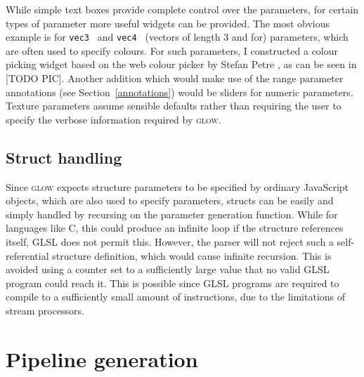 \documentclass[12pt,twoside,notitlepage]{report}
\begin{document}
While simple text boxes provide complete control over the parameters, for certain types of parameter more useful widgets can be provided. The most obvious example is for {\tt vec3 } and {\tt vec4 } (vectors of length 3 and for) parameters, which are often used to specify colours. For such parameters, I constructed a colour picking widget based on the web colour picker by Stefan Petre \cite{color}, as can be seen in [TODO PIC]. Another addition which would make use of the range parameter annotations (see Section~\ref{annotations}) would be sliders for numeric parameters. Texture parameters assume sensible defaults rather than requiring the user to specify the verbose information required by \textsc{glow}.

\subsection{Struct handling}
Since \textsc{glow} expects structure parameters to be specified by ordinary JavaScript objects, which are also used to specify parameters, structs can be easily and simply handled by recursing on the parameter generation function. While for languages like C, this could produce an infinite loop if the structure references itself, GLSL does not permit this. However, the parser will not reject such a self-referential structure definition, which would cause infinite recursion. This is avoided using a counter set to a sufficiently large value that no valid GLSL program could reach it. This is possible since GLSL programs are required to compile to a sufficiently small amount of instructions, due to the limitations of stream processors.

\section{Pipeline generation}
\end{document}
